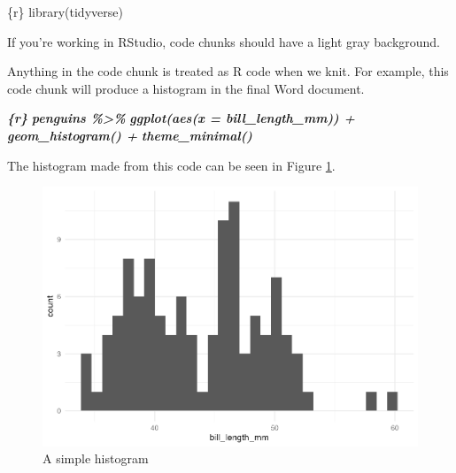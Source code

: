 \documentclass[
]{book}
\newenvironment{Shaded}{\begin{snugshade}}{\end{snugshade}}
\newcommand{\InformationTok}[1]{\textcolor[rgb]{0.56,0.35,0.01}{\textbf{\textit{#1}}}}
\newcommand{\NormalTok}[1]{#1}
\begin{document}
\begin{Shaded}
\begin{Highlighting}[]
\NormalTok{\textasciigrave{}\textasciigrave{}\textasciigrave{}\{r\}}
\NormalTok{library(tidyverse)}
\NormalTok{\textasciigrave{}\textasciigrave{}\textasciigrave{}}
\end{Highlighting}
\end{Shaded}

If you're working in RStudio, code chunks should have a light gray background.

Anything in the code chunk is treated as R code when we knit. For example, this code chunk will produce a histogram in the final Word document.

\begin{Shaded}
\begin{Highlighting}[]
\InformationTok{\textasciigrave{}\textasciigrave{}\textasciigrave{}\{r\}}
\InformationTok{penguins \%\textgreater{}\% }
\InformationTok{  ggplot(aes(x = bill\_length\_mm)) +}
\InformationTok{  geom\_histogram() +}
\InformationTok{  theme\_minimal()}
\InformationTok{\textasciigrave{}\textasciigrave{}\textasciigrave{}}
\end{Highlighting}
\end{Shaded}

The histogram made from this code can be seen in Figure \ref{fig:simple-histogram}.

\begin{figure}
\includegraphics[width=1\linewidth]{rmarkdown_files/figure-latex/simple-histogram-1} \caption{A simple histogram}\label{fig:simple-histogram}
\end{figure}
\end{document}
